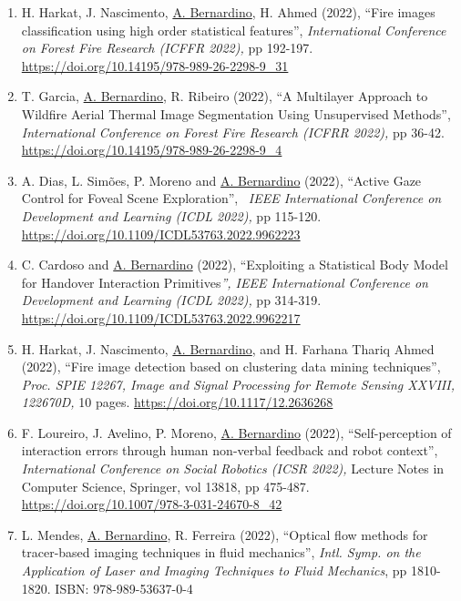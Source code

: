 \begin{enumerate}
  A. John, J. van Opstal, \ul{A. Bernardino} (2023), ``A Cable-Driven
  Robotic Eye for Understanding Eye-Movement Control'',
  \emph{International Conference on Automation, Robotics and
  Applications (ICARA 2023)}, pp 128-133.
  \url{https://doi.org/10.1109/ICARA56516.2023.10126021}
\item
  H. Harkat, J. Nascimento, \ul{A. Bernardino}, H. Ahmed (2022), ``Fire
  images classification using high order statistical features'',
  \emph{International Conference on Forest Fire Research (ICFFR 2022),}
  pp 192-197. \url{https://doi.org/10.14195/978-989-26-2298-9_31}~
\item
  T. Garcia, \ul{A. Bernardino}, R. Ribeiro (2022), ``A Multilayer
  Approach to Wildfire Aerial Thermal Image Segmentation Using
  Unsupervised Methods'', \emph{International Conference on Forest Fire
  Research (ICFRR 2022),} pp 36-42.
  \url{https://doi.org/10.14195/978-989-26-2298-9_4}~
\item
  A. Dias, L. Simões, P. Moreno and \ul{A. Bernardino} (2022), ``Active
  Gaze Control for Foveal Scene Exploration'',~ \emph{IEEE International
  Conference on Development and Learning (ICDL 2022),} pp 115-120.
  \url{https://doi.org/10.1109/ICDL53763.2022.9962223}~
\item
  C. Cardoso and \ul{A. Bernardino} (2022), ``Exploiting a Statistical
  Body Model for Handover Interaction Primitives\emph{'', IEEE
  International Conference on Development and Learning (ICDL 2022),} pp
  314-319. \url{https://doi.org/10.1109/ICDL53763.2022.9962217}~
\item
  H. Harkat, J. Nascimento, \ul{A. Bernardino}, and H. Farhana Thariq
  Ahmed (2022), ``Fire image detection based on clustering data mining
  techniques'', \emph{Proc. SPIE 12267, Image and Signal Processing for
  Remote Sensing XXVIII, 122670D,} 10 pages.
  \url{https://doi.org/10.1117/12.2636268}~
\item
  F. Loureiro, J. Avelino, P. Moreno, \ul{A. Bernardino} (2022),
  ``Self-perception of interaction errors through human non-verbal
  feedback and robot context'', \emph{International Conference on Social
  Robotics (ICSR 2022),} Lecture Notes in Computer Science, Springer,
  vol 13818, pp 475-487.
  \url{https://doi.org/10.1007/978-3-031-24670-8_42}
\item
  L. Mendes, \ul{A. Bernardino}, R. Ferreira (2022), ``Optical flow
  methods for tracer-based imaging techniques in fluid mechanics'',
  \emph{Intl. Symp. on the Application of Laser and Imaging Techniques
  to Fluid Mechanics}, pp 1810-1820. ISBN: 978-989-53637-0-4

\end{enumerate}
